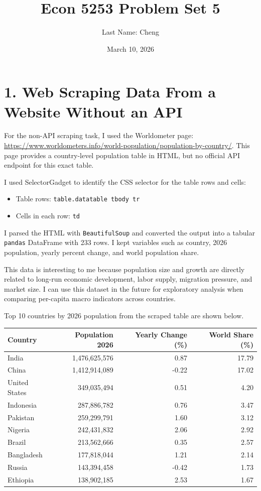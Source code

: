 \documentclass[11pt]{article}
\title{Econ 5253 Problem Set 5}
\author{Last Name: Cheng}
\date{March 10, 2026}
\begin{document}
\maketitle

\section*{1. Web Scraping Data From a Website Without an API}
For the non-API scraping task, I used the Worldometer page:
\url{https://www.worldometers.info/world-population/population-by-country/}.
This page provides a country-level population table in HTML, but no official API endpoint for this exact table.

I used SelectorGadget to identify the CSS selector for the table rows and cells:
\begin{itemize}
\item Table rows: \texttt{table.datatable tbody tr}
\item Cells in each row: \texttt{td}
\end{itemize}
I parsed the HTML with \texttt{BeautifulSoup} and converted the output into a tabular \texttt{pandas} DataFrame with 233 rows.
I kept variables such as country, 2026 population, yearly percent change, and world population share.

This data is interesting to me because population size and growth are directly related to long-run economic development, labor supply, migration pressure, and market size.
I can use this dataset in the future for exploratory analysis when comparing per-capita macro indicators across countries.

Top 10 countries by 2026 population from the scraped table are shown below.

\begin{center}
\begin{tabular}{lrrr}
\toprule
Country & Population 2026 & Yearly Change (\%) & World Share (\%) \\
\midrule
India & 1,476,625,576 & 0.87 & 17.79 \\
China & 1,412,914,089 & -0.22 & 17.02 \\
United States & 349,035,494 & 0.51 & 4.20 \\
Indonesia & 287,886,782 & 0.76 & 3.47 \\
Pakistan & 259,299,791 & 1.60 & 3.12 \\
Nigeria & 242,431,832 & 2.06 & 2.92 \\
Brazil & 213,562,666 & 0.35 & 2.57 \\
Bangladesh & 177,818,044 & 1.21 & 2.14 \\
Russia & 143,394,458 & -0.42 & 1.73 \\
Ethiopia & 138,902,185 & 2.53 & 1.67 \\
\bottomrule
\end{tabular}
\end{center}
\end{document}

